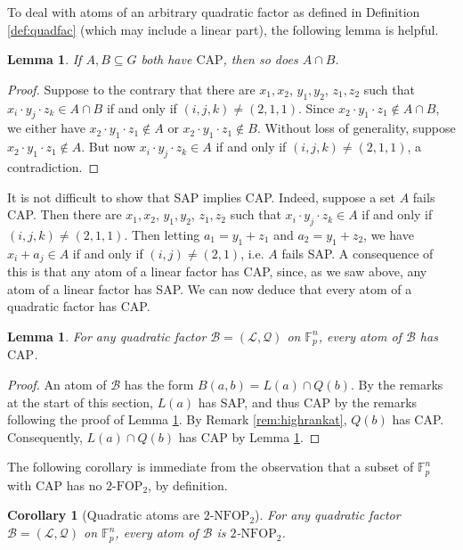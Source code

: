 \documentclass[12pt,oneside,british,a4wide]{amsart}
\newtheorem{lemma}[theorem]{Lemma}
\newtheorem{corollary}[theorem]{Corollary}
\numberwithin{equation}{section}
\theoremstyle{definition}
\def\F{\mathbb{F}}
\def\FOP{\mathrm{FOP}}
\def\NFOP{\mathrm{NFOP}}
\newcommand{\calL}{\mathcal{L}}
\newcommand{\calB}{\mathcal{B}}
\newcommand{\calQ}{\mathcal{Q}}
\begin{document}
To deal with atoms of an arbitrary quadratic factor as defined in Definition \ref{def:quadfac} (which may include a linear part), the following lemma is helpful.

\begin{lemma}\label{lem:quadint}
If $A,B\subseteq G$ both have $\mathrm{CAP}$, then so does $A\cap B$. 
\end{lemma}

\begin{proof}
Suppose to the contrary that there are $x_1,x_2$, $y_1,y_2$, $z_1,z_2$ such that $x_i\cdot y_j\cdot z_k\in A\cap B$ if and only if $(i,j,k)\neq (2,1,1)$. Since $x_2\cdot y_1\cdot z_1\notin A\cap B$, we either have $x_2\cdot y_1\cdot z_1\notin A$ or $x_2\cdot y_1\cdot z_1\notin B$.  Without loss of generality, suppose $x_2\cdot y_1\cdot z_1\notin A$.  But now $x_i\cdot y_j\cdot z_k\in A$ if and only if $(i,j,k)\neq (2,1,1)$, a contradiction.  
\end{proof}

It is not difficult to show that SAP implies CAP.  Indeed, suppose a set $A$ fails CAP.  Then there are  $x_1,x_2$, $y_1,y_2$, $z_1,z_2$ such that $x_i\cdot y_j\cdot z_k\in A$ if and only if $(i,j,k)\neq (2,1,1)$.  Then letting $a_1=y_1+z_1$ and $a_2=y_1+z_2$, we have $x_i+a_j\in A$ if and only if $(i,j)\neq (2,1)$, i.e. $A$ fails SAP.  A consequence of this is that any atom of a linear factor has CAP, since, as we saw above, any atom of a linear factor has SAP.  We can now deduce that every atom of a quadratic factor has CAP.

 \begin{lemma}\label{lem:quadatomcap}
 For any quadratic factor $\calB=(\calL,\calQ)$ on $\F_p^n$, every atom of $\calB$  has $\mathrm{CAP}$.
 \end{lemma}
 \begin{proof}
 An atom of $\calB$ has the form $B(a,b)=L(a)\cap Q(b)$.  By the remarks at the start of this section, $L(a)$ has SAP, and thus CAP by the remarks following the proof of Lemma \ref{lem:quadint}.  By Remark \ref{rem:highrankat}, $Q(b)$ has CAP.  Consequently, $L(a)\cap Q(b)$ has CAP by Lemma \ref{lem:quadint}.
 \end{proof}
 
 The following corollary is immediate from the observation that a subset of $\F_p^n$ with CAP has no $2$-$\FOP_2$, by definition.
 
 \begin{corollary}[Quadratic atoms are $2$-$\NFOP_2$]\label{cor:quadatomfop2}
 For any quadratic factor $\calB=(\calL,\calQ)$ on $\F_p^n$, every atom of $\calB$  is $2$-$\NFOP_2$.
 \end{corollary}
 
\end{document}
